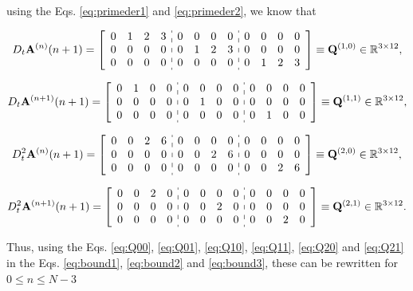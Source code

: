 using the Eqs. \ref{eq:primeder1} and \ref{eq:primeder2}, 
we know that

\begin{equation}\label{eq:Q10}
D_{t} \mathbf{A}^{(n)}(n+1)
=
\left[
\begin{array}{cccc:cccc:cccc}
0 & 1 & 2 & 3 &
0 & 0 & 0 & 0 &
0 & 0 & 0 & 0 \\
0 & 0 & 0 & 0 &
0 & 1 & 2 & 3 &
0 & 0 & 0 & 0 \\
0 & 0 & 0 & 0 &
0 & 0 & 0 & 0 &
0 & 1 & 2 & 3 
\end{array}
\right]
\equiv \mathbf{Q}^{(1,0)}\in \mathbb{R}^{3\times 12},
\end{equation}

\begin{equation}\label{eq:Q11}
D_{t} \mathbf{A}^{(n+1)}(n+1)
=
\left[
\begin{array}{cccc:cccc:cccc}
0 & 1 & 0 & 0 &
0 & 0 & 0 & 0 &
0 & 0 & 0 & 0 \\
0 & 0 & 0 & 0 &
0 & 1 & 0 & 0 &
0 & 0 & 0 & 0 \\
0 & 0 & 0 & 0 &
0 & 0 & 0 & 0 &
0 & 1 & 0 & 0 
\end{array}
\right]
\equiv \mathbf{Q}^{(1,1)}\in \mathbb{R}^{3\times 12},
\end{equation}

\begin{equation}\label{eq:Q20}
D_{t}^{2} \mathbf{A}^{(n)}(n+1)
=
\left[
\begin{array}{cccc:cccc:cccc}
0 & 0 & 2 & 6 &
0 & 0 & 0 & 0 &
0 & 0 & 0 & 0 \\
0 & 0 & 0 & 0 &
0 & 0 & 2 & 6 &
0 & 0 & 0 & 0 \\
0 & 0 & 0 & 0 &
0 & 0 & 0 & 0 &
0 & 0 & 2 & 6 
\end{array}
\right]
\equiv \mathbf{Q}^{(2,0)}\in \mathbb{R}^{3\times 12},
\end{equation}

\begin{equation}\label{eq:Q21}
D_{t}^{2} \mathbf{A}^{(n+1)}(n+1)
=
\left[
\begin{array}{cccc:cccc:cccc}
0 & 0 & 2 & 0 &
0 & 0 & 0 & 0 &
0 & 0 & 0 & 0 \\
0 & 0 & 0 & 0 &
0 & 0 & 2 & 0 &
0 & 0 & 0 & 0 \\
0 & 0 & 0 & 0 &
0 & 0 & 0 & 0 &
0 & 0 & 2 & 0 
\end{array}
\right]
\equiv \mathbf{Q}^{(2,1)}\in \mathbb{R}^{3\times 12}.
\end{equation}

Thus,
using the Eqs. \ref{eq:Q00}, \ref{eq:Q01}, \ref{eq:Q10}, \ref{eq:Q11}, \ref{eq:Q20} and \ref{eq:Q21} in 
the Eqs. \ref{eq:bound1}, \ref{eq:bound2} and \ref{eq:bound3}, 
these can be rewritten for $0 \leq n\leq N-3$

